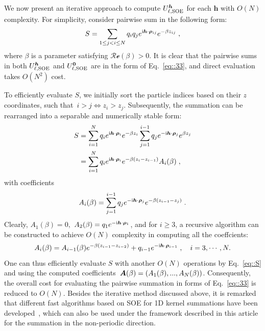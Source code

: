 We now present an iterative approach to compute $U_{\ell,\text{SOE}}^{\boldsymbol{h}}$ for each $\bm{h}$ with $O(N)$ complexity. 
For simplicity, consider pairwise sum in the following form:
\begin{equation}\label{eq::33}
	S = \sum_{1\leq j < i \leq N} q_{i} q_{j} e^{\mathrm{i} \boldsymbol{h} \cdot \boldsymbol{\rho}_{ij}} e^{ - \beta z_{ij} }\;,
\end{equation}
where $\beta$ is a parameter satisfying $\mathscr{Re}(\beta)>0$. It is clear that the pairwise sums in both $U_{\ell,\text{SOE}}^{\boldsymbol{h}}$ and $U_{\ell,\text{SOE}}^{\boldsymbol{0}}$ are in the form of Eq.~\eqref{eq::33}, and direct evaluation takes $O(N^2)$ cost. 

To efficiently evaluate $S$, we initially sort the particle indices based on their $z$ coordinates, such that~$i > j \iff z_i > z_j$.
Subsequently, the summation can be rearranged into a separable and numerically stable form:
\begin{align}
	S &=\sum_{i = 1}^N q_{i} e^{\mathrm{i} \bm{h}\cdot\bm{\rho}_{i}}e^{-\beta z_{i}} \sum_{j = 1}^{i - 1} q_{j} e^{-\mathrm{i} \bm{h}\cdot\bm{\rho}_{j}}e^{\beta z_{j}} \label{eq::S0} \\ 
	&= \sum_{i = 1}^N q_{i} e^{\mathrm{i} \bm{h}\cdot\bm{\rho}_{i}}e^{-\beta(z_{i} - z_{i - 1})}A_{i}(\beta)\;, \label{eq::S}
\end{align}
with coefficients
\begin{equation}
	A_{i}(\beta) =  \sum_{j = 1}^{i - 1} q_{j} e^{-\mathrm{i} \bm{h}\cdot\bm{\rho}_{j}}e^{-\beta(z_{i - 1} - z_{j})}\;.
\end{equation}
Clearly, $A_1(\beta)=0,$ $A_2(\beta)=q_1e^{-\mathrm{i} \bm{h}\cdot\bm{\rho}_1}$, and for $i\geq 3$, a recursive algorithm can be constructed to achieve $O(N)$ complexity in computing all the coeffcients:
\begin{equation}\label{eq::35}
	A_{i}(\beta) = A_{i - 1}(\beta) e^{-\beta(z_{i - 1} - z_{i - 2})} + q_{i - 1}e^{-\mathrm{i} \bm{h}\cdot\bm{\rho}_{i-1}}\;,\quad i = 3, \cdots, N.
\end{equation}
One can thus efficiently evaluate $S$ with another $O(N)$ operations by Eq.~\eqref{eq::S} and using the computed coefficients~$\boldsymbol{A}(\beta) = (A_1(\beta), ..., A_N(\beta))$. 
Consequently, the overall cost for evaluating the pairwise summation in forms of Eq.~\eqref{eq::33} is reduced to $O(N)$.
Besides the iterative method discussed above, it is remarked that different fast algorithms based on SOE for 1D kernel summations have been developed~\cite{jiang2021approximating,GIMBUTAS2020815}, which can also be used under the framework described in this article for the summation in the non-periodic direction.

